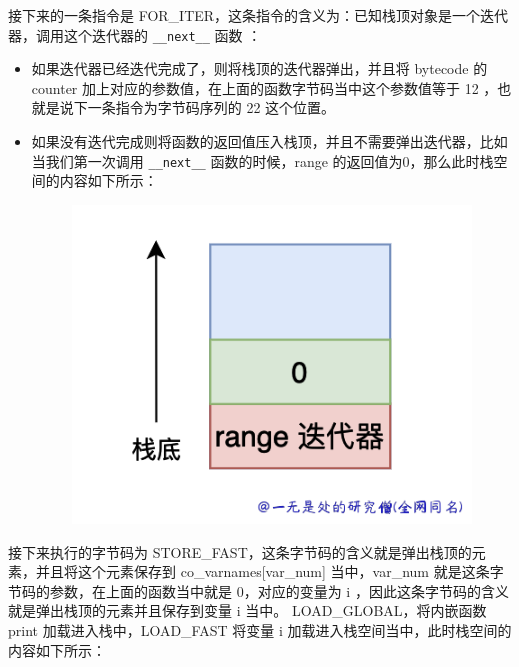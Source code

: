 接下来的一条指令是 FOR\_ITER，这条指令的含义为：已知栈顶对象是一个迭代器，调用这个迭代器的 \verb|__next__| 函数 ：
\begin{itemize}
\item 如果迭代器已经迭代完成了，则将栈顶的迭代器弹出，并且将 bytecode 的 counter 加上对应的参数值，在上面的函数字节码当中这个参数值等于 12 ，也就是说下一条指令为字节码序列的 22 这个位置。 
\item 如果没有迭代完成则将函数的返回值压入栈顶，并且不需要弹出迭代器，比如当我们第一次调用 \verb|__next__| 函数的时候，range 的返回值为0，那么此时栈空间的内容如下所示： 

    \begin{figure}[H]
        \centering
            \includegraphics[scale=.25]{images/68-bytecode.png}
						\caption{ }
        \label{fig:my_label}
    \end{figure}
    
\end{itemize}
接下来执行的字节码为 STORE\_FAST，这条字节码的含义就是弹出栈顶的元素，并且将这个元素保存到 co\_varnames[var\_num] 当中，var\_num 就是这条字节码的参数，在上面的函数当中就是 0，对应的变量为 i ，因此这条字节码的含义就是弹出栈顶的元素并且保存到变量 i 当中。
LOAD\_GLOBAL，将内嵌函数 print 加载进入栈中，LOAD\_FAST 将变量 i 加载进入栈空间当中，此时栈空间的内容如下所示：

